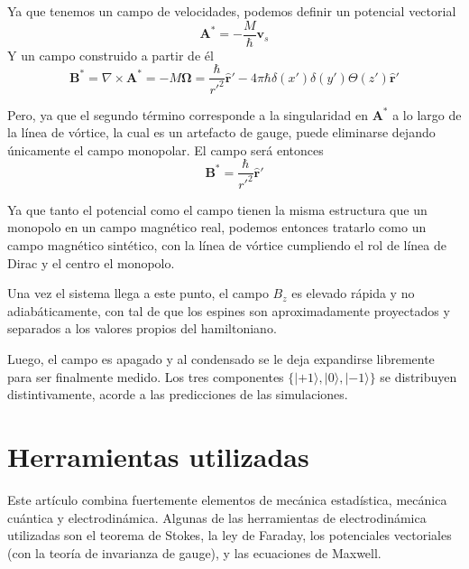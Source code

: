 \documentclass[twocolumn]{article}
\numberwithin{equation}{section}
\newcommand{\0}{\textcolor{gray}{0}}
\newcommand{\ro}{\nabla\times}
\newcommand{\rv}{\mathbf{r}}
\newcommand{\rhat}{\hat{\rv}}
\newcommand{\n}[1]{\mathbf{#1}}
\begin{document}
	Ya que tenemos un campo de velocidades, podemos definir un potencial vectorial
	\begin{equation}
		\n{A}^* = -\frac{M}{\hbar} \n{v}_s
	\end{equation}
	Y un campo construido a partir de él
	\begin{equation*}
		\n{B}^* = \ro\n{A}^* = -M \n{\Omega} = \frac{\hbar}{r'^2}\rhat' - 4\pi\hbar \delta(x')\delta(y')\Theta(z')\rhat'
	\end{equation*}
	
	Pero, ya que el segundo término corresponde a la singularidad en $\n{A}^*$ a lo largo de la línea de vórtice, la cual es un artefacto de gauge, puede eliminarse dejando únicamente el campo monopolar. El campo será entonces
	\begin{equation}
		\n{B}^* = \frac{\hbar}{r'^2}\rhat'
	\end{equation}
	
	Ya que tanto el potencial como el campo tienen la misma estructura que un monopolo en un campo magnético real, podemos entonces tratarlo como un campo magnético sintético, con la línea de vórtice cumpliendo el rol de línea de Dirac y el centro el monopolo.
	
	Una vez el sistema llega a este punto, el campo $B_z$ es elevado rápida y no adiabáticamente, con tal de que los espines son aproximadamente proyectados y separados a los valores propios del hamiltoniano.
	
	Luego, el campo es apagado y al condensado se le deja expandirse libremente para ser finalmente medido. Los tres componentes $\{|+1\rangle, |0\rangle, |-1\rangle\}$ se distribuyen distintivamente, acorde a las predicciones de las simulaciones.
	
	\vspace{-3mm}		
	\section{Herramientas utilizadas}
	Este artículo combina fuertemente elementos de mecánica estadística, mecánica cuántica y electrodinámica. Algunas de las herramientas de electrodinámica utilizadas son el teorema de Stokes, la ley de Faraday, los potenciales vectoriales (con la teoría de invarianza de gauge), y las ecuaciones de Maxwell.
	
	\vspace{-3mm}
	
\end{document}
